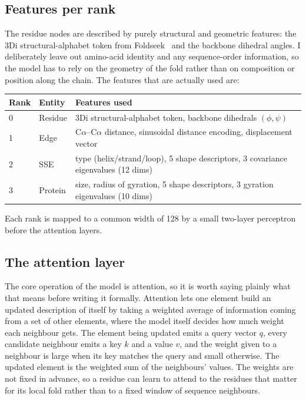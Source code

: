\documentclass[11pt,a4paper]{article}
\theoremstyle{definition}
\begin{document}
\subsection{Features per rank}

The residue nodes are described by purely structural and geometric features: the
3Di structural-alphabet token from Foldseek~\cite{foldseek} and the backbone
dihedral angles. I deliberately leave out amino-acid identity and any
sequence-order information, so the model has to rely on the geometry of the fold
rather than on composition or position along the chain. The features that are
actually used are:

\begin{center}
\begin{tabular}{@{}l l l@{}}
\toprule
Rank & Entity & Features used\\
\midrule
0 & Residue   & 3Di structural-alphabet token, backbone dihedrals $(\phi,\psi)$\\
1 & Edge      & C$\alpha$--C$\alpha$ distance, sinusoidal distance encoding, displacement vector\\
2 & SSE       & type (helix/strand/loop), 5 shape descriptors, 3 covariance eigenvalues (12 dims)\\
3 & Protein   & size, radius of gyration, 5 shape descriptors, 3 gyration eigenvalues (10 dims)\\
\bottomrule
\end{tabular}
\end{center}

Each rank is mapped to a common width of 128 by a small two-layer perceptron
before the attention layers.

\subsection{The attention layer}
\label{sec:attention}

The core operation of the model is attention, so it is worth saying plainly what
that means before writing it formally. Attention lets one element build an updated
description of itself by taking a weighted average of information coming from a set
of other elements, where the model itself decides how much weight each neighbour
gets. The element being updated emits a query vector $q$, every candidate
neighbour emits a key $k$ and a value $v$, and the weight given to a neighbour is
large when its key matches the query and small otherwise. The updated element is
the weighted sum of the neighbours' values. The weights are not fixed in advance,
so a residue can learn to attend to the residues that matter for its local fold
rather than to a fixed window of sequence neighbours.
\end{document}
